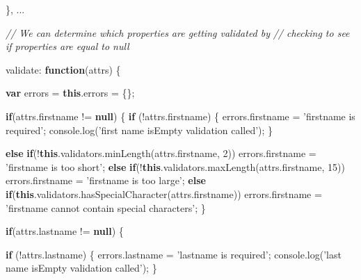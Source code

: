 \documentclass[9pt]{book}
\newenvironment{Shaded}{}{}
\newcommand{\KeywordTok}[1]{\textcolor[rgb]{0.00,0.44,0.13}{\textbf{{#1}}}}
\newcommand{\DataTypeTok}[1]{\textcolor[rgb]{0.56,0.13,0.00}{{#1}}}
\newcommand{\DecValTok}[1]{\textcolor[rgb]{0.25,0.63,0.44}{{#1}}}
\newcommand{\StringTok}[1]{\textcolor[rgb]{0.25,0.44,0.63}{{#1}}}
\newcommand{\CommentTok}[1]{\textcolor[rgb]{0.38,0.63,0.69}{\textit{{#1}}}}
\newcommand{\OtherTok}[1]{\textcolor[rgb]{0.00,0.44,0.13}{{#1}}}
\newcommand{\FunctionTok}[1]{\textcolor[rgb]{0.02,0.16,0.49}{{#1}}}
\newcommand{\NormalTok}[1]{{#1}}
\begin{document}
\begin{Shaded}
\begin{Highlighting}[]
          \NormalTok{\},}
         \NormalTok{...}

    \CommentTok{// We can determine which properties are getting validated by}
    \CommentTok{// checking to see if properties are equal to null}

        \DataTypeTok{validate}\NormalTok{: }\KeywordTok{function}\NormalTok{(attrs) \{}

          \KeywordTok{var} \NormalTok{errors = }\KeywordTok{this}\NormalTok{.}\FunctionTok{errors} \NormalTok{= \{\};}

          \KeywordTok{if}\NormalTok{(}\OtherTok{attrs}\NormalTok{.}\FunctionTok{firstname} \NormalTok{!= }\KeywordTok{null}\NormalTok{) \{}
              \KeywordTok{if} \NormalTok{(!}\OtherTok{attrs}\NormalTok{.}\FunctionTok{firstname}\NormalTok{) \{}
                  \OtherTok{errors}\NormalTok{.}\FunctionTok{firstname} \NormalTok{= }\StringTok{'firstname is required'}\NormalTok{;}
                  \OtherTok{console}\NormalTok{.}\FunctionTok{log}\NormalTok{(}\StringTok{'first name isEmpty validation called'}\NormalTok{);}
              \NormalTok{\}}

              \KeywordTok{else} \KeywordTok{if}\NormalTok{(!}\KeywordTok{this}\NormalTok{.}\OtherTok{validators}\NormalTok{.}\FunctionTok{minLength}\NormalTok{(}\OtherTok{attrs}\NormalTok{.}\FunctionTok{firstname}\NormalTok{, }\DecValTok{2}\NormalTok{))}
                \OtherTok{errors}\NormalTok{.}\FunctionTok{firstname} \NormalTok{= }\StringTok{'firstname is too short'}\NormalTok{;}
              \KeywordTok{else} \KeywordTok{if}\NormalTok{(!}\KeywordTok{this}\NormalTok{.}\OtherTok{validators}\NormalTok{.}\FunctionTok{maxLength}\NormalTok{(}\OtherTok{attrs}\NormalTok{.}\FunctionTok{firstname}\NormalTok{, }\DecValTok{15}\NormalTok{))}
                \OtherTok{errors}\NormalTok{.}\FunctionTok{firstname} \NormalTok{= }\StringTok{'firstname is too large'}\NormalTok{;}
              \KeywordTok{else} \KeywordTok{if}\NormalTok{(}\KeywordTok{this}\NormalTok{.}\OtherTok{validators}\NormalTok{.}\FunctionTok{hasSpecialCharacter}\NormalTok{(}\OtherTok{attrs}\NormalTok{.}\FunctionTok{firstname}\NormalTok{)) }\OtherTok{errors}\NormalTok{.}\FunctionTok{firstname} \NormalTok{= }\StringTok{'firstname cannot contain special characters'}\NormalTok{;}
          \NormalTok{\}}

          \KeywordTok{if}\NormalTok{(}\OtherTok{attrs}\NormalTok{.}\FunctionTok{lastname} \NormalTok{!= }\KeywordTok{null}\NormalTok{) \{}

              \KeywordTok{if} \NormalTok{(!}\OtherTok{attrs}\NormalTok{.}\FunctionTok{lastname}\NormalTok{) \{}
                  \OtherTok{errors}\NormalTok{.}\FunctionTok{lastname} \NormalTok{= }\StringTok{'lastname is required'}\NormalTok{;}
                  \OtherTok{console}\NormalTok{.}\FunctionTok{log}\NormalTok{(}\StringTok{'last name isEmpty validation called'}\NormalTok{);}
              \NormalTok{\}}


\end{Highlighting}
\end{Shaded}
\end{document}
